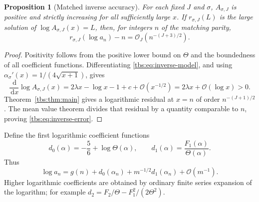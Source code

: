 \documentclass[11pt,a4paper]{article}
\numberwithin{equation}{section}
\newtheorem{proposition}[theorem]{Proposition}
\theoremstyle{definition}
\newcommand{\dd}{\,\mathrm d}
\newcommand{\OO}{\mathcal O}
\begin{document}
\begin{proposition}[Matched inverse accuracy]\label{tbs:prop:inverse-accuracy}
For each fixed $J$ and $\sigma$, $A_{\sigma,J}$ is positive and strictly
increasing for all sufficiently large $x$. If $r_{\sigma,J}(L)$ is the
large solution of $\log A_{\sigma,J}(x)=L$, then, for integers $n$ of
the matching parity,
\begin{equation}\label{tbs:eq:inverse-error}
 r_{\sigma,J}(\log a_n)-n=\OO_J(n^{-(J+3)/2}).
\end{equation}
\end{proposition}
\begin{proof}
Positivity follows from the positive lower bound on $\Theta$ and the
boundedness of all coefficient functions. Differentiating
\eqref{tbs:eq:inverse-model}, and using
$\alpha_\sigma'(x)=1/(4\sqrt{x+1})$, gives
\[
 \frac{\dd}{\dd x}\log A_{\sigma,J}(x)
 =2\lambda x-\log x-1+c+\OO(x^{-1/2})
 =2\lambda x+\OO(\log x)>0.
\]
Theorem~\ref{tbs:thm:main} gives a logarithmic residual at $x=n$ of order
$n^{-(J+1)/2}$. The mean value theorem divides that residual by a
quantity comparable to $n$, proving \eqref{tbs:eq:inverse-error}.
\end{proof}

Define the first logarithmic coefficient functions
\begin{equation}\label{tbs:eq:d-functions}
 d_0(\alpha)=-\frac56+\log\Theta(\alpha),\qquad
 d_1(\alpha)=\frac{F_1(\alpha)}{\Theta(\alpha)}.
\end{equation}
Thus
\[
 \log a_n=g(n)+d_0(\alpha_n)
                  +m^{-1/2}d_1(\alpha_n)+\OO(m^{-1}).
\]
Higher logarithmic coefficients are obtained by ordinary finite series
expansion of the logarithm; for example
$d_2=F_2/\Theta-F_1^2/(2\Theta^2)$.
\end{document}
